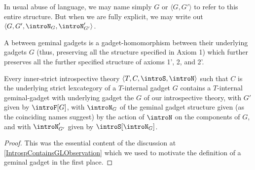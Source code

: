 \begin{definition}
In usual abuse of language, we may name simply $G$ or $\langle G, G' \rangle$ to refer to this entire structure. But when we are fully explicit, we may write out $\langle G, G', \introN_{G}, \introN'_{G'} \rangle$.


A  between geminal gadgets is a gadget-homomorphism between their underlying gadgets $G$ (thus, preserving all the structure specified in Axiom 1) which further preserves all the further specified structure of axioms 1', 2, and 2'.
\end{definition}

\begin{theorem}\label{IntrospContainsGL}
Every inner-strict introspective theory $\langle T, C, \introS, \introN \rangle$ such that $C$ is the underlying strict lexcategory of a $T$-internal gadget $G$ contains a $T$-internal geminal-gadget with underlying gadget the $G$ of our introspective theory, with $G'$ given by $\introF[G]$, with $\introN_{G}$ of the geminal gadget structure given (as the coinciding names suggest) by the action of $\introN$ on the components of $G$, and with $\introN'_{G'}$ given by $\introS[\introN_{G}]$.
\end{theorem}
\begin{proof}
This was the essential content of the discussion at \cref{IntrospContainsGLObservation} which we used to motivate the definition of a geminal gadget in the first place.
\end{proof}

